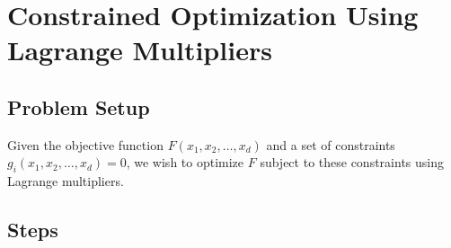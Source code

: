 \documentclass[11pt]{article}
\begin{document}
\section*{Constrained Optimization Using Lagrange Multipliers}

\subsection*{Problem Setup}

Given the objective function \( F(x_1, x_2, \dots, x_d) \) and a set of constraints \( g_i(x_1, x_2, \dots, x_d) = 0 \), we wish to optimize \( F \) subject to these constraints using Lagrange multipliers.

\subsection*{Steps}
\end{document}
